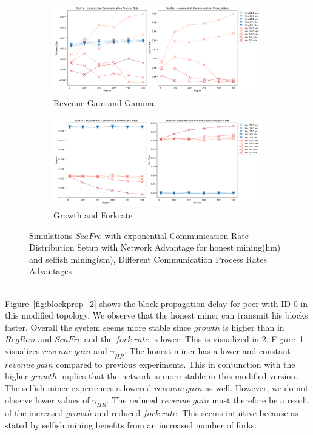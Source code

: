 \begin{figure}[tbp]
	\begin{subfigure}[b]{\textwidth}
		\includegraphics[width=\textwidth]{figures/revenue_gamma_barabasi_bc_dc.pdf}
		\caption{Revenue Gain and Gamma}
		\label{fig:revgain_bc_dc}
	\end{subfigure}
	\begin{subfigure}[b]{\textwidth}
		\includegraphics[width=\textwidth]{figures/growth_forkrate_barabasi_bc_dc.pdf}
		\caption{Growth and Forkrate}
		\label{fig:growth_bc_dc}
	\end{subfigure}
\caption{Simulations $ScaFre$ with exponential Communication Rate Distribution Setup with Network Advantage for honest mining(hm) and selfish mining(sm), Different Communication Process Rates Advantages}
\label{fig:bc_dc}
\end{figure}\\
Figure~\ref{fig:blockprop_2} shows the block propagation delay for peer with ID $0$ in this modified topology. We observe that the honest miner can transmit his blocks faster. Overall the system seems more stable since $growth$ is higher than in $RegRan$ and $ScaFre$ and the $fork~rate$ is lower. This is visualized in \ref{fig:growth_bc_dc}. Figure~\ref{fig:revgain_bc_dc} visualizes $revenue~gain$ and $\gamma_{HR}$. The honest miner has a lower and constant $revenue~gain$ compared to previous experiments. This in conjunction with the higher $growth$ implies that the network is more stable in this modified version. The selfish miner experiences a lowered $revenue~gain$ as well. However, we do not observe lower values of $\gamma_{HR}$. The reduced $revenue~gain$ must therefore be a result of the increased $growth$ and reduced $fork~rate$. This seems intuitive because as stated by  selfish mining benefits from an increased number of forks.\\
